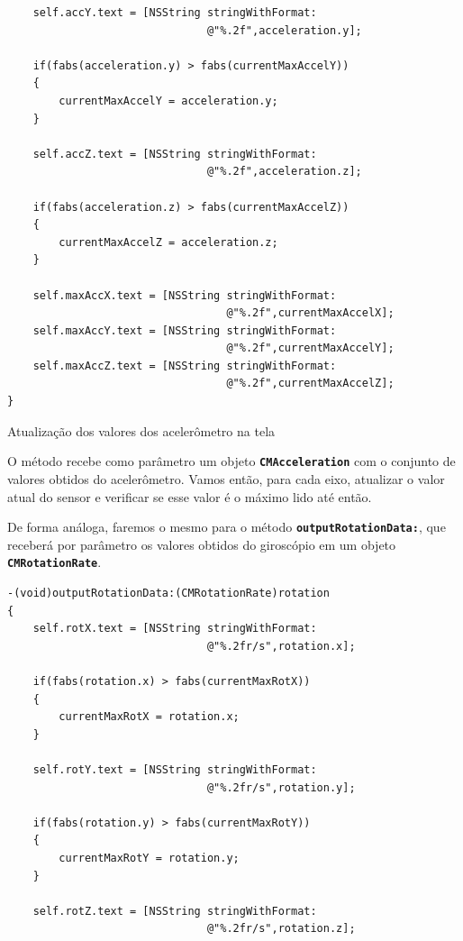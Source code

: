 \documentclass[a4paper,12pt,brazil,doubleside]{book}
\begin{document}
\begin{singlespace}
\begin{listing}[H]
\begin{verbatim}
    self.accY.text = [NSString stringWithFormat:
                               @"%.2f",acceleration.y];
    
    if(fabs(acceleration.y) > fabs(currentMaxAccelY))
    {
        currentMaxAccelY = acceleration.y;
    }
    
    self.accZ.text = [NSString stringWithFormat:
                               @"%.2f",acceleration.z];
    
    if(fabs(acceleration.z) > fabs(currentMaxAccelZ))
    {
        currentMaxAccelZ = acceleration.z;
    }
    
    self.maxAccX.text = [NSString stringWithFormat:
                                  @"%.2f",currentMaxAccelX];
    self.maxAccY.text = [NSString stringWithFormat:
                                  @"%.2f",currentMaxAccelY];
    self.maxAccZ.text = [NSString stringWithFormat:
                                  @"%.2f",currentMaxAccelZ];
}
\end{verbatim}
\caption{Atualização dos valores dos acelerômetro na tela}
\end{listing}


O método recebe como parâmetro um objeto \texttt{\textbf{CMAcceleration}} com o conjunto de valores obtidos do acelerômetro. Vamos então, para cada eixo, atualizar o valor atual do sensor e verificar se esse valor é o máximo lido até então.

De forma análoga, faremos o mesmo para o método \texttt{\textbf{outputRotationData:}}, que receberá por parâmetro os valores obtidos do giroscópio em um objeto \texttt{\textbf{CMRotationRate}}.

\begin{listing}[H]
\begin{verbatim}
-(void)outputRotationData:(CMRotationRate)rotation
{
    self.rotX.text = [NSString stringWithFormat:
                               @"%.2fr/s",rotation.x];
    
    if(fabs(rotation.x) > fabs(currentMaxRotX))
    {
        currentMaxRotX = rotation.x;
    }
    
    self.rotY.text = [NSString stringWithFormat:
                               @"%.2fr/s",rotation.y];
    
    if(fabs(rotation.y) > fabs(currentMaxRotY))
    {
        currentMaxRotY = rotation.y;
    }
    
    self.rotZ.text = [NSString stringWithFormat:
                               @"%.2fr/s",rotation.z];
    

\end{verbatim}
\end{listing}
\end{singlespace}
\end{document}
